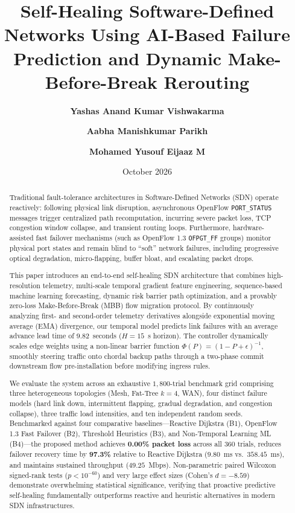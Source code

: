 \documentclass[10pt,twocolumn]{article}
\title{\textbf{Self-Healing Software-Defined Networks Using AI-Based Failure Prediction and Dynamic Make-Before-Break Rerouting}}
\author{\textbf{Yashas Anand Kumar Vishwakarma}}
\author{\textbf{Aabha Manishkumar Parikh}}
\author{\textbf{Mohamed Yusouf Eijaaz M}}
\affil{School of Computer Science and Engineering (SCOPE)\\
Vellore Institute of Technology, Vellore, Tamil Nadu, India}
\date{October 2026}
\begin{document}
\maketitle

\begin{abstract}
Traditional fault-tolerance architectures in Software-Defined Networks (SDN) operate reactively: following physical link disruption, asynchronous OpenFlow \texttt{PORT\_STATUS} messages trigger centralized path recomputation, incurring severe packet loss, TCP congestion window collapse, and transient routing loops. Furthermore, hardware-assisted fast failover mechanisms (such as OpenFlow 1.3 \texttt{OFPGT\_FF} groups) monitor physical port states and remain blind to ``soft'' network failures, including progressive optical degradation, micro-flapping, buffer bloat, and escalating packet drops. 

This paper introduces an end-to-end self-healing SDN architecture that combines high-resolution telemetry, multi-scale temporal gradient feature engineering, sequence-based machine learning forecasting, dynamic risk barrier path optimization, and a provably zero-loss Make-Before-Break (MBB) flow migration protocol. By continuously analyzing first- and second-order telemetry derivatives alongside exponential moving average (EMA) divergence, our temporal model predicts link failures with an average advance lead time of $9.82$~seconds ($H=15$~s horizon). The controller dynamically scales edge weights using a non-linear barrier function $\Phi(P) = (1 - P + \epsilon)^{-1}$, smoothly steering traffic onto chordal backup paths through a two-phase commit downstream flow pre-installation before modifying ingress rules.

We evaluate the system across an exhaustive $1{,}800$-trial benchmark grid comprising three heterogeneous topologies (Mesh, Fat-Tree $k=4$, WAN), four distinct failure models (hard link down, intermittent flapping, gradual degradation, and congestion collapse), three traffic load intensities, and ten independent random seeds. Benchmarked against four comparative baselines---Reactive Dijkstra (B1), OpenFlow 1.3 Fast Failover (B2), Threshold Heuristics (B3), and Non-Temporal Learning ML (B4)---the proposed method achieves \textbf{0.00\% packet loss} across all 360 trials, reduces failover recovery time by \textbf{97.3\%} relative to Reactive Dijkstra ($9.80$~ms vs.\ $358.45$~ms), and maintains sustained throughput ($49.25$~Mbps). Non-parametric paired Wilcoxon signed-rank tests ($p < 10^{-60}$) and very large effect sizes (Cohen's $d = -8.59$) demonstrate overwhelming statistical significance, verifying that proactive predictive self-healing fundamentally outperforms reactive and heuristic alternatives in modern SDN infrastructures.
\end{abstract}
\end{document}
